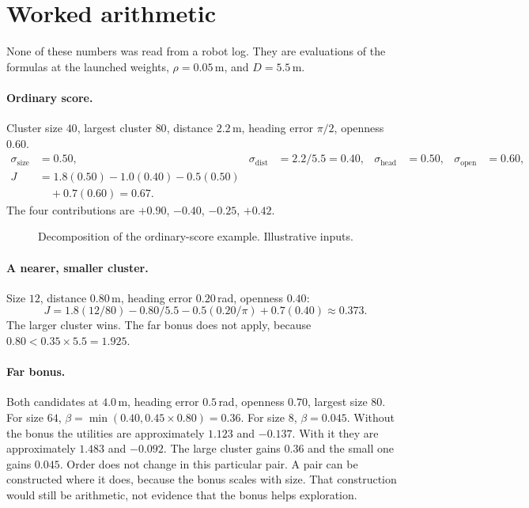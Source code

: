 \documentclass[11pt]{article}
\begin{document}
\section{Worked arithmetic}
\label{sec:examples}
None of these numbers was read from a robot log. They are evaluations of the formulas at the launched weights, $\rho=0.05$\,m, and $D=5.5$\,m.

\paragraph{Ordinary score.}
Cluster size $40$, largest cluster $80$, distance $2.2$\,m, heading error $\pi/2$, openness $0.60$.
\begin{align*}
\sigma_{\mathrm{size}}&=0.50, &
\sigma_{\mathrm{dist}}&=2.2/5.5=0.40, &
\sigma_{\mathrm{head}}&=0.50, &
\sigma_{\mathrm{open}}&=0.60,\\
J&=1.8(0.50)-1.0(0.40)-0.5(0.50)\\
&\quad +0.7(0.60)=0.67.
\end{align*}
The four contributions are $+0.90$, $-0.40$, $-0.25$, $+0.42$.

\begin{figure}[ht]
\centering
\FigScore
\caption{Decomposition of the ordinary-score example. Illustrative inputs.}
\label{fig:score}
\end{figure}

\paragraph{A nearer, smaller cluster.}
Size $12$, distance $0.80$\,m, heading error $0.20$\,rad, openness $0.40$:
\[
J=1.8(12/80)-0.80/5.5-0.5(0.20/\pi)+0.7(0.40)\approx 0.373.
\]
The larger cluster wins. The far bonus does not apply, because $0.80<0.35\times 5.5=1.925$.

\paragraph{Far bonus.}
Both candidates at $4.0$\,m, heading error $0.5$\,rad, openness $0.70$, largest size $80$. For size $64$, $\beta=\min(0.40,0.45\times 0.80)=0.36$. For size $8$, $\beta=0.045$. Without the bonus the utilities are approximately $1.123$ and $-0.137$. With it they are approximately $1.483$ and $-0.092$. The large cluster gains $0.36$ and the small one gains $0.045$. Order does not change in this particular pair. A pair can be constructed where it does, because the bonus scales with size. That construction would still be arithmetic, not evidence that the bonus helps exploration.
\end{document}
